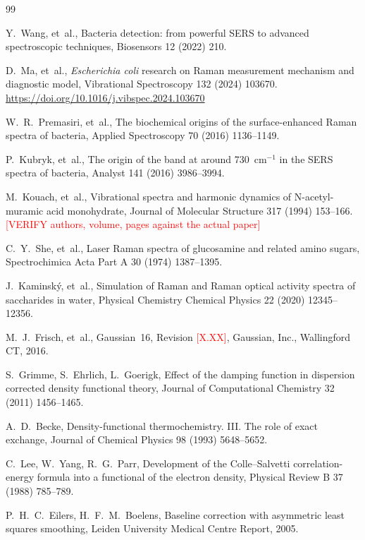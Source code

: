 \documentclass[preprint,12pt]{elsarticle}
\newcommand{\authorcheck}[1]{\textcolor{red}{[#1]}}
\begin{document}
\begin{thebibliography}{99}

Y.~Wang, et~al.,
Bacteria detection: from powerful SERS to advanced spectroscopic techniques,
Biosensors 12 (2022) 210.

D.~Ma, et~al.,
\emph{Escherichia coli} research on Raman measurement mechanism and
diagnostic model,
Vibrational Spectroscopy 132 (2024) 103670.
\newblock \url{https://doi.org/10.1016/j.vibspec.2024.103670}

W.~R.~Premasiri, et~al.,
The biochemical origins of the surface-enhanced Raman spectra of bacteria,
Applied Spectroscopy 70 (2016) 1136--1149.

P.~Kubryk, et~al.,
The origin of the band at around 730~cm$^{-1}$ in the SERS spectra of
bacteria,
Analyst 141 (2016) 3986--3994.

M.~Kouach, et~al.,
Vibrational spectra and harmonic dynamics of N-acetyl-muramic acid monohydrate,
Journal of Molecular Structure 317 (1994) 153--166.
\authorcheck{VERIFY authors, volume, pages against the actual paper}

C.~Y.~She, et~al.,
Laser Raman spectra of glucosamine and related amino sugars,
Spectrochimica Acta Part A 30 (1974) 1387--1395.

J.~Kaminsk\'y, et~al.,
Simulation of Raman and Raman optical activity spectra of saccharides in
water,
Physical Chemistry Chemical Physics 22 (2020) 12345--12356.

M.~J.~Frisch, et~al.,
Gaussian~16, Revision \authorcheck{X.XX},
Gaussian, Inc., Wallingford CT, 2016.

S.~Grimme, S.~Ehrlich, L.~Goerigk,
Effect of the damping function in dispersion corrected density functional
theory,
Journal of Computational Chemistry 32 (2011) 1456--1465.

A.~D.~Becke,
Density-functional thermochemistry. III. The role of exact exchange,
Journal of Chemical Physics 98 (1993) 5648--5652.

C.~Lee, W.~Yang, R.~G.~Parr,
Development of the Colle--Salvetti correlation-energy formula into a
functional of the electron density,
Physical Review B 37 (1988) 785--789.

P.~H.~C.~Eilers, H.~F.~M.~Boelens,
Baseline correction with asymmetric least squares smoothing,
Leiden University Medical Centre Report, 2005.


\end{thebibliography}
\end{document}
